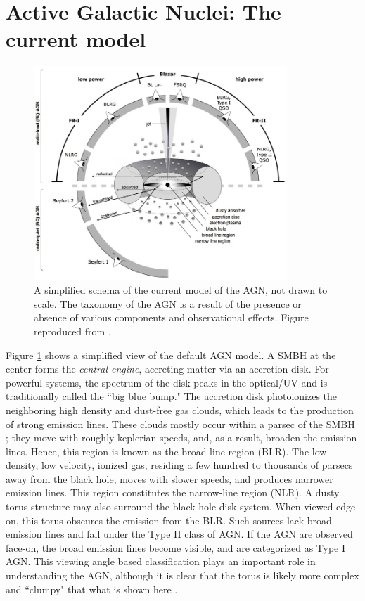 \section{Active Galactic Nuclei: The current model \label{sec:agn_current_model}}
\begin{figure}
        \centering
    \includegraphics[width=0.849\textwidth]{images/misc/agn_model.jpg}%
    \caption{A simplified schema of the current model of the AGN, not drawn to scale. The taxonomy of the AGN is a result of the presence or absence of various components and observational effects. Figure reproduced from \citet{beckmann2012agn}.\label{fig:agn_model} }
\end{figure}
 Figure \ref{fig:agn_model} shows a simplified view of the default AGN model.  A SMBH at the center forms the \textit{central engine}, accreting matter via an accretion disk. For powerful systems, the spectrum of the disk peaks in the optical/UV and is traditionally called the ``big blue bump." The accretion disk photoionizes the neighboring high density and dust-free gas clouds, which leads to the production of strong  emission lines. These clouds mostly occur within a parsec of the SMBH \citep{peterson2006broad}; they move with roughly keplerian speeds, and, as a result,  broaden the emission lines. Hence, this region is known as the broad-line region (BLR). The low-density, low velocity, ionized gas, residing a few hundred to thousands of parsecs away from the black hole, moves with slower speeds, and produces narrower emission lines. This region constitutes the narrow-line region (NLR). A dusty torus structure may also surround the black hole-disk system. When viewed edge-on, this torus obscures the emission from the BLR. Such sources lack broad emission lines and fall under the Type II class of AGN. If the AGN are observed face-on, the broad emission lines become visible, and are categorized as Type I AGN. This viewing angle based classification plays an important role in understanding the AGN, although it is clear that the torus is likely more complex and ``clumpy" that what is shown here \citep[see][and references there in]{H_nig_2019}.
